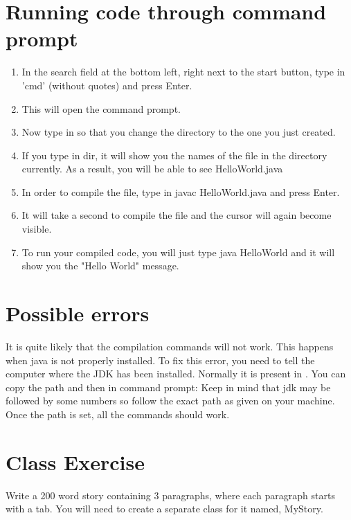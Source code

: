 \documentclass[a4paper]{article}
\begin{document}
\section{Running code through command prompt}

\begin{enumerate}
\item In the search field at the bottom left, right next to the start button, type in 'cmd' (without quotes) and press Enter.
\item This will open the command prompt.
\item Now type in  so that you change the directory to the one you just created.
\item If you type in dir, it will show you the names of the file in the directory currently. As a result, you will be able to see HelloWorld.java
\item In order to compile the file, type in javac HelloWorld.java and press Enter.
\item It will take a second to compile the file and the cursor will again become visible.
\item To run your compiled code, you will just type java HelloWorld and it will show you the "Hello World" message.
\end{enumerate}
\section{Possible errors}
It is quite likely that the compilation commands will not work. This happens when java is not properly installed. To fix this error, you need to tell the computer where the JDK has been installed. Normally it is present in . You can copy the path and then in command prompt:
\vspace{5mm} 
\vspace{5mm} 
Keep in mind that jdk may be followed by some numbers so follow the exact path as given on your machine.
\vspace{2mm}\\
Once the path is set, all the commands should work.
\section{Class Exercise}
Write a 200 word story containing 3 paragraphs, where each paragraph starts with a tab. You will need to create a separate class for it named, MyStory.
\end{document}
